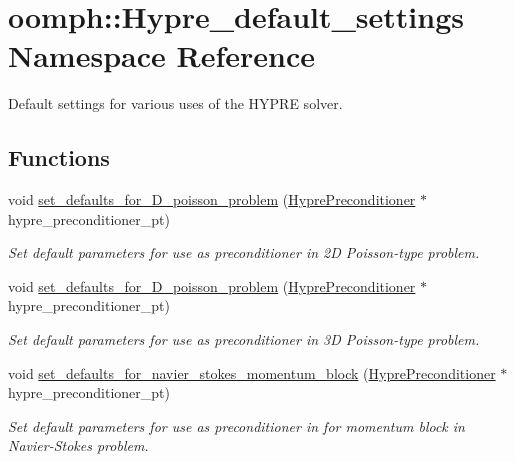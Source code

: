 \hypertarget{namespaceoomph_1_1Hypre__default__settings}{}\section{oomph\+:\+:Hypre\+\_\+default\+\_\+settings Namespace Reference}
\label{namespaceoomph_1_1Hypre__default__settings}


Default settings for various uses of the H\+Y\+P\+RE solver.  


\subsection*{Functions}
\begin{DoxyCompactItemize}
\item 
void \hyperlink{namespaceoomph_1_1Hypre__default__settings_a8e616a1267ca88b82032b059ab573241}{set\+\_\+defaults\+\_\+for\+\_\+D\+\_\+poisson\+\_\+problem} (\hyperlink{classoomph_1_1HyprePreconditioner}{Hypre\+Preconditioner} $\ast$hypre\+\_\+preconditioner\+\_\+pt)
\begin{DoxyCompactList}\small\item\em Set default parameters for use as preconditioner in 2D Poisson-\/type problem. \end{DoxyCompactList}\item 
void \hyperlink{namespaceoomph_1_1Hypre__default__settings_a8c726c9ee016fbf9257a9cbd667873d6}{set\+\_\+defaults\+\_\+for\+\_\+D\+\_\+poisson\+\_\+problem} (\hyperlink{classoomph_1_1HyprePreconditioner}{Hypre\+Preconditioner} $\ast$hypre\+\_\+preconditioner\+\_\+pt)
\begin{DoxyCompactList}\small\item\em Set default parameters for use as preconditioner in 3D Poisson-\/type problem. \end{DoxyCompactList}\item 
void \hyperlink{namespaceoomph_1_1Hypre__default__settings_a2537d48181e8542f129522a06b457e11}{set\+\_\+defaults\+\_\+for\+\_\+navier\+\_\+stokes\+\_\+momentum\+\_\+block} (\hyperlink{classoomph_1_1HyprePreconditioner}{Hypre\+Preconditioner} $\ast$hypre\+\_\+preconditioner\+\_\+pt)
\begin{DoxyCompactList}\small\item\em Set default parameters for use as preconditioner in for momentum block in Navier-\/\+Stokes problem. \end{DoxyCompactList}\end{DoxyCompactItemize}


